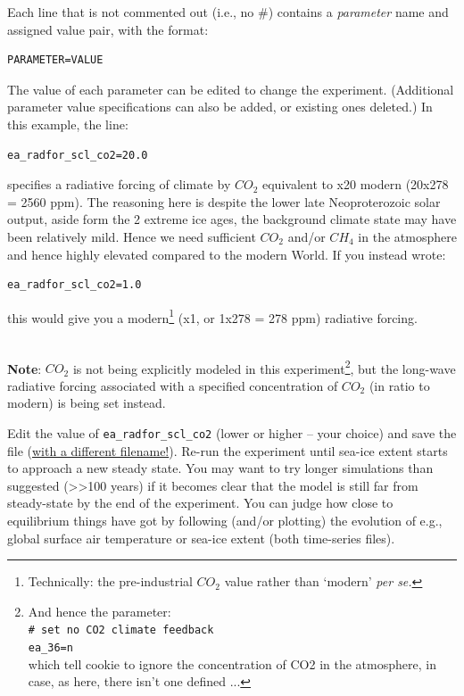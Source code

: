 \noindent Each line that is not commented out (i.e., no \#) contains a \textit{parameter} name and assigned value pair, with the format:
\vspace{-1mm}\small\begin{verbatim}
PARAMETER=VALUE
\end{verbatim}\normalsize\vspace{-1mm}
The value of each parameter can be edited to change the experiment. (Additional parameter value specifications can also be added, or existing ones deleted.) In this example, the line:
\vspace{-1mm}\small\begin{verbatim}
ea_radfor_scl_co2=20.0
\end{verbatim}\normalsize\vspace{-1mm}
specifies a radiative forcing of climate by \(CO_{2}\) equivalent to x20 modern (20x278 = 2560 ppm). The reasoning here is despite the lower late Neoproterozoic solar output, aside form the 2 extreme ice ages, the background climate state may have been relatively mild. Hence we need sufficient \(CO_{2}\) and/or \(CH_{4}\) in the atmosphere and hence highly elevated compared to the modern World. If you instead wrote:
\vspace{-1mm}\small\begin{verbatim}
ea_radfor_scl_co2=1.0
\end{verbatim}\normalsize\vspace{-1mm}
this would give you a modern\footnote{Technically: the pre-industrial \(CO_{2}\) value rather than ‘modern’ \textit{per se.}} (x1, or 1x278 = 278 ppm) radiative forcing.

\vspace{1mm}
\noindent \\\textbf{Note}: \(CO_{2}\) is not being explicitly modeled in this experiment\footnote{And hence the parameter:
\\\texttt{\# set no CO2 climate feedback}
\\\texttt{ea\_36=n}
\\which tell cookie to ignore the concentration of CO2 in the atmosphere, in case, as here, there isn't one defined ...}, but the long-wave radiative forcing associated with a specified concentration of \(CO_{2}\) (in ratio to modern) is being set instead.

Edit the value of \texttt{ea\_radfor\_scl\_co2} (lower or higher -- your choice) and save the file (\uline{with a different filename!}). Re-run the experiment until sea-ice extent starts to approach a new steady state. You may want to try  longer simulations than suggested (\textgreater\textgreater 100 years) if it becomes clear that the model is still far from steady-state by the end of the experiment. You can judge how close to equilibrium things have got by following (and/or plotting) the evolution of e.g., global surface air temperature or sea-ice extent (both time-series files).

